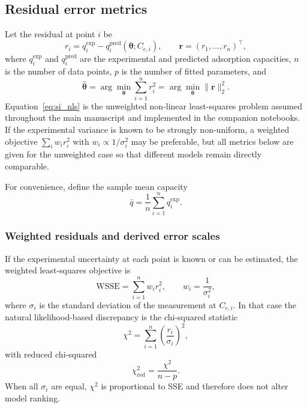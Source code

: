\documentclass[journal=aamick,manuscript=article]{achemso}
\begin{document}
\subsection{Residual error metrics}
\label{sec:si_residuals}

Let the residual at point $i$ be
\begin{equation}
	r_i = q_i^{\exp} - q_i^{\mathrm{pred}}(\boldsymbol{\theta}; C_{e,i}),
	\qquad
	\mathbf{r} = (r_1,\dots,r_n)^\top,
	\label{eq:si_residual_vector}
\end{equation}
where $q_i^{\exp}$ and $q_i^{\mathrm{pred}}$ are the experimental and
predicted adsorption capacities, $n$ is the number of data points, $p$
is the number of fitted parameters, and
\begin{equation}
	\hat{\boldsymbol{\theta}}
	=
	\arg\min_{\boldsymbol{\theta}}
	\sum_{i=1}^{n} r_i^2
	=
	\arg\min_{\boldsymbol{\theta}} \|\mathbf{r}\|_2^2.
	\label{eq:si_nls}
\end{equation}
Equation~\eqref{eq:si_nls} is the unweighted non-linear least-squares
problem assumed throughout the main manuscript and implemented in the
companion notebooks. If the experimental variance is known to be
strongly non-uniform, a weighted objective
$\sum_i w_i r_i^2$ with $w_i \propto 1/\sigma_i^2$ may be preferable,
but all metrics below are given for the unweighted case so that
different models remain directly comparable.

For convenience, define the sample mean capacity
\begin{equation}
	\bar{q} = \frac{1}{n}\sum_{i=1}^{n} q_i^{\exp}.
	\label{eq:si_qbar}
\end{equation}

\subsubsection{Weighted residuals and derived error scales}

If the experimental uncertainty at each point is known or can be
estimated, the weighted least-squares objective is
\begin{equation}
	\mathrm{WSSE}
	=
	\sum_{i=1}^{n} w_i r_i^2,
	\qquad
	w_i = \frac{1}{\sigma_i^2},
	\label{eq:si_WSSE}
\end{equation}
where $\sigma_i$ is the standard deviation of the measurement at
$C_{e,i}$. In that case the natural likelihood-based discrepancy is the
chi-squared statistic
\begin{equation}
	\chi^2
	=
	\sum_{i=1}^{n}
	\left(\frac{r_i}{\sigma_i}\right)^2,
	\label{eq:si_chi2}
\end{equation}
with reduced chi-squared
\begin{equation}
	\chi^2_{\mathrm{red}}
	=
	\frac{\chi^2}{n-p}.
	\label{eq:si_chi2red}
\end{equation}
When all $\sigma_i$ are equal, $\chi^2$ is proportional to SSE and
therefore does not alter model ranking.
\end{document}
